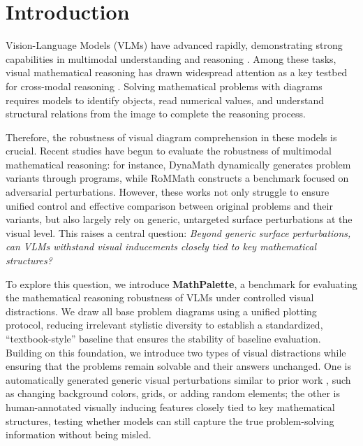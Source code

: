 \documentclass{article}
\theoremstyle{plain}
\theoremstyle{definition}
\theoremstyle{remark}
\begin{document}
\printAffiliationsAndNotice{}  %

\begin{abstract}
  This document provides a basic paper template and submission guidelines.
  Abstracts must be a single paragraph, ideally between 4--6 sentences long.
  Gross violations will trigger corrections at the camera-ready phase.
\end{abstract}

\section{Introduction}

Vision-Language Models (VLMs) have advanced rapidly, demonstrating strong capabilities in multimodal understanding and reasoning \cite{bai2025qwen3vl, singh2025gpt5, glmv2025glm45v, deng2026openvlthinker}. Among these tasks, visual mathematical reasoning has drawn widespread attention as a key testbed for cross-modal reasoning \cite{lu2024mathvista, wang2024mathvision, zhang2024mathverse}. Solving mathematical problems with diagrams requires models to identify objects, read numerical values, and understand structural relations from the image to complete the reasoning process.

Therefore, the robustness of visual diagram comprehension in these models is crucial. Recent studies have begun to evaluate the robustness of multimodal mathematical reasoning: for instance, DynaMath \cite{zou2025dynamath} dynamically generates problem variants through programs, while RoMMath \cite{zhao2025rommath} constructs a benchmark focused on adversarial perturbations. However, these works not only struggle to ensure unified control and effective comparison between original problems and their variants, but also largely rely on generic, untargeted surface perturbations at the visual level. This raises a central question: \emph{Beyond generic surface perturbations, can VLMs withstand visual inducements closely tied to key mathematical structures?}

To explore this question, we introduce \textbf{MathPalette}, a benchmark for evaluating the mathematical reasoning robustness of VLMs under controlled visual distractions. We draw all base problem diagrams using a unified plotting protocol, reducing irrelevant stylistic diversity to establish a standardized, ``textbook-style'' baseline that ensures the stability of baseline evaluation. Building on this foundation, we introduce two types of visual distractions while ensuring that the problems remain solvable and their answers unchanged. One is automatically generated generic visual perturbations similar to prior work \cite{zou2025dynamath, zhao2025rommath, bae2026idis}, such as changing background colors, grids, or adding random elements; the other is human-annotated visually inducing features closely tied to key mathematical structures, testing whether models can still capture the true problem-solving information without being misled.
\end{document}
